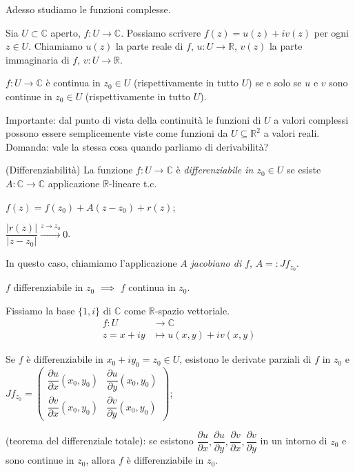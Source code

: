 Adesso studiamo le funzioni complesse.

Sia $U \subset \mathbb{C}$ aperto, $f:U \rightarrow \mathbb{C}$. Possiamo scrivere $f(z)=u(z)+iv(z)$ per ogni $z \in U$. Chiamiamo $u(z)$ la parte reale di $f$, $u:U \rightarrow \mathbb{R}$, $v(z)$ la parte immaginaria di $f$, $v:U \rightarrow \mathbb{R}$.

\begin{ftt}
  $f:U \rightarrow \mathbb{C}$ è continua in $z_0 \in U$ (rispettivamente in tutto $U$) se e solo se $u$ e $v$ sono continue in $z_0 \in U$ (rispettivamente in tutto $U$).
\end{ftt}

Importante: dal punto di vista della continuità le funzioni di $U$ a valori complessi possono essere semplicemente viste come funzioni da $U \subseteq \mathbb{R}^2$ a valori reali. Domanda: vale la stessa cosa quando parliamo di derivabilità?

\begin{defn}
  (Differenziabilità) La funzione $f:U \rightarrow \mathbb{C}$ è \textit{differenziabile in $z_0 \in U$} se esiste $A:\mathbb{C} \rightarrow \mathbb{C}$ applicazione $\mathbb{R}$-lineare t.c.
  \begin{nlist}
    \item $f(z)=f(z_0)+A(z-z_0)+r(z)$;
    \item $\dfrac{|r(z)|}{|z-z_0|} \xrightarrow[]{z \rightarrow z_0} 0$.
  \end{nlist}
  In questo caso, chiamiamo l'applicazione $A$ \textit{jacobiano di $f$}, $A=: Jf_{z_0}$.
\end{defn}

\begin{oss}
  $f$ differenziabile in $z_0$ $\implies$ $f$ continua in $z_0$.
\end{oss}

Fissiamo la base $\{1, i\}$ di $\mathbb{C}$ come $\mathbb{R}$-spazio vettoriale.
\begin{align*}
  f:U &\rightarrow \mathbb{C}\\
  z=x+iy &\mapsto u(x, y)+iv(x, y)
\end{align*}

\begin{ftt}
  \begin{nlist}
    \item Se $f$ è differenziabile in $x_0+iy_0=z_0 \in U$, esistono le derivate parziali di $f$ in $z_0$ e $Jf_{z_0}=\begin{pmatrix}
      \dfrac{\partial u}{\partial x}(x_0, y_0) & \dfrac{\partial u}{\partial y}(x_0, y_0)\\
      \dfrac{\partial v}{\partial x}(x_0, y_0) & \dfrac{\partial v}{\partial y}(x_0, y_0)
  \end{pmatrix}$;
  \item (teorema del differenziale totale): se esistono $\dfrac{\partial u}{\partial x}, \dfrac{\partial u}{\partial y}, \dfrac{\partial v}{\partial x}, \dfrac{\partial v}{\partial y}$ in un intorno di $z_0$ e sono continue in $z_0$, allora $f$ è differenziabile in $z_0$.
  \end{nlist}
\end{ftt}

